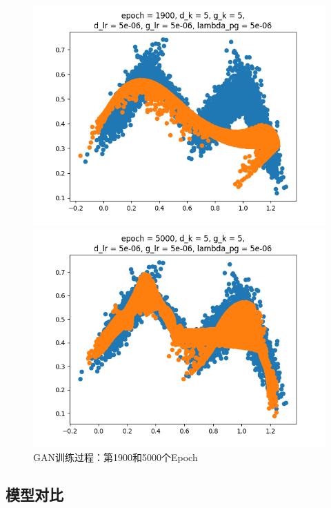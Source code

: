 \documentclass{article}
\begin{document}
\begin{figure}[H]
    \begin{minipage}[H]{0.5\linewidth}
        \centering
        \includegraphics[width=\textwidth]{figures/WGANGP_1900.png}
    \end{minipage}
    \begin{minipage}[H]{0.5\linewidth}
        \centering
        \includegraphics[width=\textwidth]{figures/WGANGP_5000.png}
    \end{minipage}
    \caption{GAN训练过程：第1900和5000个Epoch}
\end{figure}

\subsection{模型对比}
\end{document}
